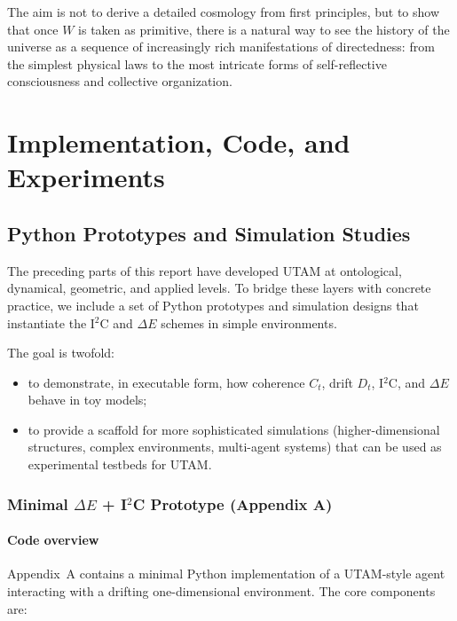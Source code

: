 \documentclass[12pt,a4paper]{report}
\newcommand{\Will}{W}
\begin{document}
The aim is not to derive a detailed cosmology from first principles, but to show that once \(\Will\) is taken as primitive, there is a natural way to see the history of the universe as a sequence of increasingly rich manifestations of directedness: from the simplest physical laws to the most intricate forms of self-reflective consciousness and collective organization.



\part{Implementation, Code, and Experiments}

\chapter{Python Prototypes and Simulation Studies}

The preceding parts of this report have developed UTAM at ontological, dynamical, geometric, and applied levels. To bridge these layers with concrete practice, we include a set of Python prototypes and simulation designs that instantiate the I$^2$C and $\Delta E$ schemes in simple environments.

The goal is twofold:

\begin{itemize}[leftmargin=2em]
    \item to demonstrate, in executable form, how coherence \(C_t\), drift \(D_t\), I$^2$C, and $\Delta E$ behave in toy models;
    \item to provide a scaffold for more sophisticated simulations (higher-dimensional structures, complex environments, multi-agent systems) that can be used as experimental testbeds for UTAM.
\end{itemize}

\section{Minimal \texorpdfstring{$\Delta E$}{ΔE} + I$^2$C Prototype (Appendix A)}

\subsection*{Code overview}

Appendix~A contains a minimal Python implementation of a UTAM-style agent interacting with a drifting one-dimensional environment. The core components are:
\end{document}
